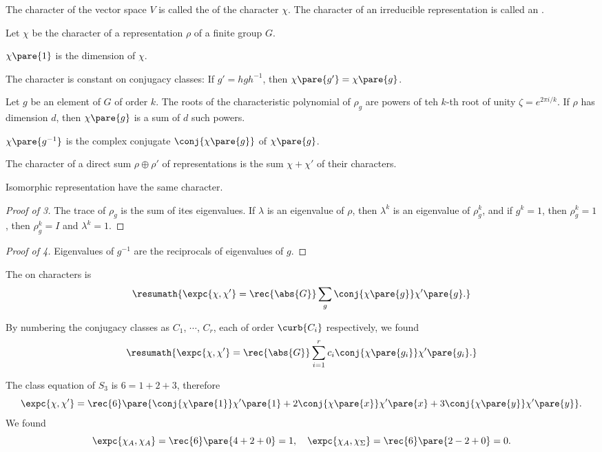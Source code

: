 \documentclass[hidelinks]{article}
\let\oldgloss\gloss
\def\gloss#1{\textnormal{\textbf{\oldgloss{#1}}}}
\begin{document}
The character of the vector space $V$ is called the  of the character $\chi$. The character of an irreducible representation is called an .
\begin{proposition}
    Let $\chi$ be the character of a representation $\rho$ of a finite group $G$.
    \begin{cenum}
        \item $\chi\pare{1}$ is the dimension of $\chi$.
        \item The character is constant on conjugacy classes: If $g' = hgh^{-1}$, then $\chi\pare{g'} = \chi\pare{g}$.
        \item Let $g$ be an element of $G$ of order $k$. The roots of the characteristic polynomial of $\rho_g$ are powers of teh $k$-th root of unity $\zeta = e^{2\pi i/k}$. If $\rho$ has dimension $d$, then $\chi\pare{g}$ is a sum of $d$ such powers.
        \item $\chi\pare{g^{-1}}$ is the complex conjugate $\conj{\chi\pare{g}}$ of $\chi\pare{g}$.
        \item The character of a direct sum $\rho \oplus \rho'$ of representations is the sum $\chi + \chi'$ of their characters.
        \item Isomorphic representation have the same character.
    \end{cenum}
\end{proposition}
\begin{proof}[Proof of 3]
    The trace of $\rho_g$ is the sum of ites eigenvalues. If $\lambda$ is an eigenvalue of $\rho$, then $\lambda^k$ is an eigenvalue of $\rho_g^k$, and if $g^k = 1$, then $\rho_g^k = 1$, then $\rho_g^k = I$ and $\lambda^k = 1$.
\end{proof}
\begin{proof}[Proof of 4]
    Eigenvalues of $g^{-1}$ are the reciprocals of eigenvalues of $g$.
\end{proof}
\begin{definition}
    The  on characters is
    \[ \resumath{\expc{\chi,\chi'} = \rec{\abs{G}}\sum_g \conj{\chi\pare{g}}\chi'\pare{g}.} \]
\end{definition}
By numbering the conjugacy classes as $C_1$, $\cdots$, $C_r$, each of order $\curb{C_i}$ respectively, we found
\[ \resumath{\expc{\chi,\chi'} = \rec{\abs{G}}\sum_{i=1}^r c_i\conj{\chi\pare{g_i}}\chi'\pare{g_i}.} \]
\begin{ex}
    The class equation of $S_3$ is $6=1+2+3$, therefore
    \[ \expc{\chi,\chi'} = \rec{6}\pare{\conj{\chi\pare{1}}\chi'\pare{1} + 2\conj{\chi\pare{x}}\chi'\pare{x} + 3\conj{\chi\pare{y}}\chi'\pare{y}}. \]
    We found
    \[ \expc{\chi_A,\chi_A} = \rec{6}\pare{4+2+0} = 1,\quad \expc{\chi_A,\chi_\Sigma} = \rec{6}\pare{2-2+0} = 0. \]
\end{ex}
\end{document}
